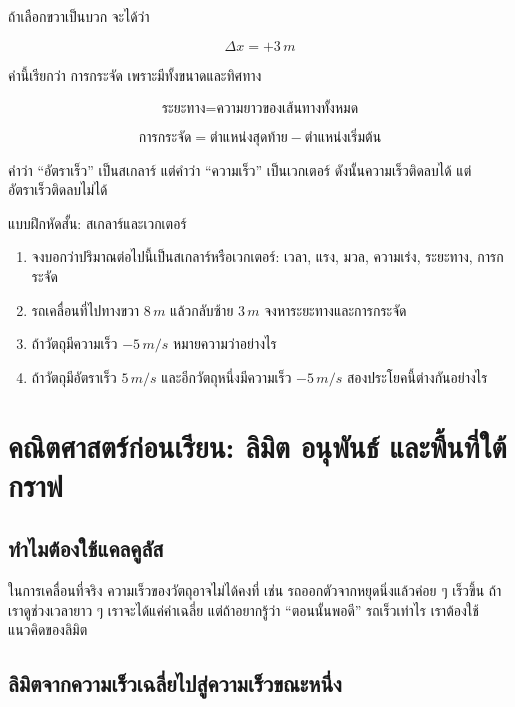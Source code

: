 \documentclass[12pt,a4paper]{report}
\begin{document}
ถ้าเลือกขวาเป็นบวก จะได้ว่า

\[
\Delta x = +3\,\si{m}
\]

ค่านี้เรียกว่า การกระจัด เพราะมีทั้งขนาดและทิศทาง

\begin{tcolorbox}[title=สรุป]
\[
\text{ระยะทาง} = \text{ความยาวของเส้นทางทั้งหมด}
\]

\[
\text{การกระจัด} = \text{ตำแหน่งสุดท้าย} - \text{ตำแหน่งเริ่มต้น}
\]
\end{tcolorbox}

\begin{tcolorbox}[title=ข้อควรจำสำหรับ สอวน.]
คำว่า ``อัตราเร็ว'' เป็นสเกลาร์ แต่คำว่า ``ความเร็ว'' เป็นเวกเตอร์ ดังนั้นความเร็วติดลบได้ แต่อัตราเร็วติดลบไม่ได้
\end{tcolorbox}

\begin{exercisebox}{แบบฝึกหัดสั้น: สเกลาร์และเวกเตอร์}
\begin{enumerate}
    \item จงบอกว่าปริมาณต่อไปนี้เป็นสเกลาร์หรือเวกเตอร์: เวลา, แรง, มวล, ความเร่ง, ระยะทาง, การกระจัด
    \item รถเคลื่อนที่ไปทางขวา $8\,\si{m}$ แล้วกลับซ้าย $3\,\si{m}$ จงหาระยะทางและการกระจัด
    \item ถ้าวัตถุมีความเร็ว $-5\,\si{m/s}$ หมายความว่าอย่างไร
    \item ถ้าวัตถุมีอัตราเร็ว $5\,\si{m/s}$ และอีกวัตถุหนึ่งมีความเร็ว $-5\,\si{m/s}$ สองประโยคนี้ต่างกันอย่างไร
\end{enumerate}
\end{exercisebox}

\section{คณิตศาสตร์ก่อนเรียน: ลิมิต อนุพันธ์ และพื้นที่ใต้กราฟ}

\subsection{ทำไมต้องใช้แคลคูลัส}

ในการเคลื่อนที่จริง ความเร็วของวัตถุอาจไม่ได้คงที่ เช่น รถออกตัวจากหยุดนิ่งแล้วค่อย ๆ เร็วขึ้น ถ้าเราดูช่วงเวลายาว ๆ เราจะได้แค่ค่าเฉลี่ย แต่ถ้าอยากรู้ว่า ``ตอนนั้นพอดี'' รถเร็วเท่าไร เราต้องใช้แนวคิดของลิมิต

\subsection{ลิมิตจากความเร็วเฉลี่ยไปสู่ความเร็วขณะหนึ่ง}
\end{document}
